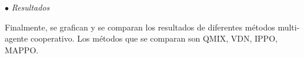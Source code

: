 \documentclass[a4paper,10pt]{article}
\begin{document}
\begin{enumerate}
\begin{itemize}
	  $\bullet$ \textit{Resultados}
	  
	  Finalmente, se grafican y se comparan los resultados de diferentes métodos multi-agente cooperativo. Los métodos que se comparan son QMIX, VDN, IPPO, MAPPO.
	  
    \end{itemize}

\end{enumerate}
\end{document}
